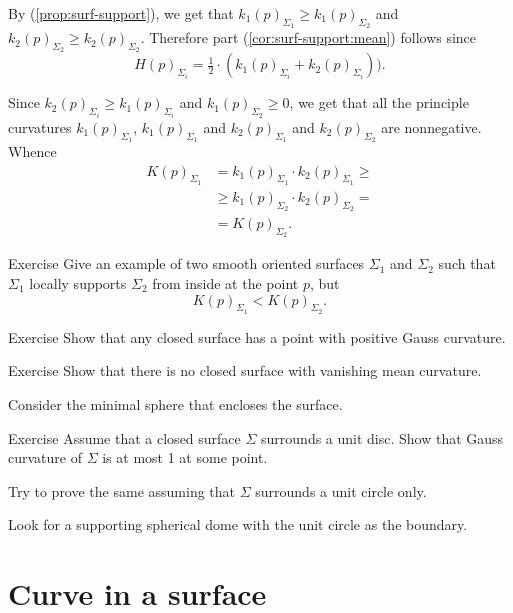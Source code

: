 By (\ref{prop:surf-support}), we get that $k_1(p)_{\Sigma_1}\ge k_1(p)_{\Sigma_2}$ and $k_2(p)_{\Sigma_2}\ge k_2(p)_{\Sigma_2}$.
Therefore part (\ref{cor:surf-support:mean}) follows since 
\[H(p)_{\Sigma_i}=\tfrac12\cdot(k_1(p)_{\Sigma_i}+k_2(p)_{\Sigma_i})).\]


 Since $k_2(p)_{\Sigma_i}\ge k_1(p)_{\Sigma_i}$ and $k_1(p)_{\Sigma_2}\ge 0$, we get that all the principle curvatures 
$k_1(p)_{\Sigma_1}$, $k_1(p)_{\Sigma_1}$ and $k_2(p)_{\Sigma_1}$ and $k_2(p)_{\Sigma_2}$ are nonnegative.
Whence
\begin{align*}
K(p)_{\Sigma_1}&=k_1(p)_{\Sigma_1}\cdot k_2(p)_{\Sigma_1}\ge 
\\
&\ge k_1(p)_{\Sigma_2}\cdot k_2(p)_{\Sigma_2}=
\\
&=K(p)_{\Sigma_2}.
\end{align*}
\qedsf

\begin{thm}{Exercise}
Give an example of two smooth oriented surfaces $\Sigma_1$ and $\Sigma_2$ such that 
$\Sigma_1$ locally supports $\Sigma_2$ from inside at the point $p$, but
\[K(p)_{\Sigma_1}<K(p)_{\Sigma_2}.\]

\end{thm}



\begin{thm}{Exercise}\label{ex:positive-gauss}
Show that any closed surface has a point with positive Gauss curvature.
\end{thm}

\begin{thm}{Exercise}
Show that there is no closed surface with vanishing mean curvature.
\end{thm}

Consider the minimal sphere that encloses the surface.

\begin{thm}{Exercise}\label{ex:surrounds-disc}
Assume that a closed surface $\Sigma$ surrounds a unit disc.
Show that Gauss curvature of $\Sigma$ is at most 1 at some point. 

Try to prove the same assuming that $\Sigma$ surrounds a unit circle only.
\end{thm} %

Look for a supporting spherical dome with the unit circle as the boundary.

\section*{Curve in a surface}

